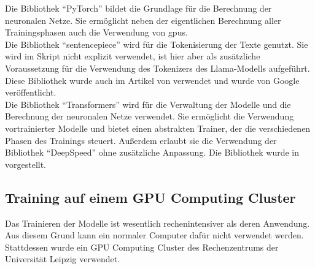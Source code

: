 Die Bibliothek \enquote{PyTorch} bildet die Grundlage für die Berechnung der neuronalen Netze.
Sie ermöglicht neben der eigentlichen Berechnung aller Trainingsphasen auch die Verwendung von \ac{gpu}s\citep{pytorch}.\\

Die Bibliothek \enquote{sentencepiece} wird für die Tokenisierung der Texte genutzt.
Sie wird im Skript nicht explizit verwendet, ist hier aber als zusätzliche Voraussetzung für die Verwendung des Tokenizers des Llama-Modells aufgeführt.
Diese Bibliothek wurde auch im Artikel von \citet{llama} verwendet und wurde von Google veröffentlicht\citep{sentencepiece}.\\

Die Bibliothek \enquote{Transformers} wird für die Verwaltung der Modelle und die Berechnung der neuronalen Netze verwendet.
Sie ermöglicht die Verwendung vortrainierter Modelle und bietet einen abstrakten Trainer, der die verschiedenen Phasen des Trainings steuert.
Außerdem erlaubt sie die Verwendung der Bibliothek \enquote{DeepSpeed} ohne zusätzliche Anpassung.
Die Bibliothek wurde in \citet{transformers} vorgestellt.\\

\subsection{Training auf einem GPU Computing Cluster}\label{sec:training-cluster}
Das Trainieren der Modelle ist wesentlich rechenintensiver als deren Anwendung.
Aus diesem Grund kann ein normaler Computer dafür nicht verwendet werden.
Stattdessen wurde ein GPU Computing Cluster des Rechenzentrums der Universität Leipzig verwendet.\\

